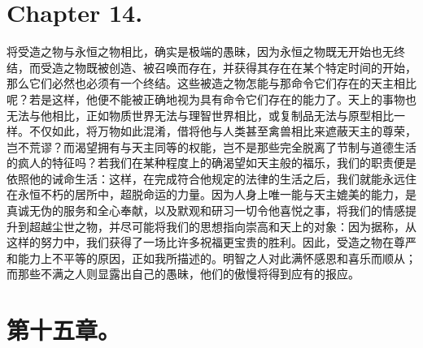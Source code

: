 
\section{Chapter 14. }

将受造之物与永恒之物相比，确实是极端的愚昧，因为永恒之物既无开始也无终结，而受造之物既被创造、被召唤而存在，并获得其存在在某个特定时间的开始，那么它们必然也必须有一个终结。这些被造之物怎能与那命令它们存在的天主相比呢？若是这样，他便不能被正确地视为具有命令它们存在的能力了。天上的事物也无法与他相比，正如物质世界无法与理智世界相比，或复制品无法与原型相比一样。不仅如此，将万物如此混淆，借将他与人类甚至禽兽相比来遮蔽天主的尊荣，岂不荒谬？而渴望拥有与天主同等的权能，岂不是那些完全脱离了节制与道德生活的疯人的特征吗？若我们在某种程度上的确渴望如天主般的福乐，我们的职责便是依照他的诫命生活：这样，在完成符合他规定的法律的生活之后，我们就能永远住在永恒不朽的居所中，超脱命运的力量。因为人身上唯一能与天主媲美的能力，是真诚无伪的服务和全心奉献，以及默观和研习一切令他喜悦之事，将我们的情感提升到超越尘世之物，并尽可能将我们的思想指向崇高和天上的对象：因为据称，从这样的努力中，我们获得了一场比许多祝福更宝贵的胜利。因此，受造之物在尊严和能力上不平等的原因，正如我所描述的。明智之人对此满怀感恩和喜乐而顺从；而那些不满之人则显露出自己的愚昧，他们的傲慢将得到应有的报应。\par


\section{第十五章。}

